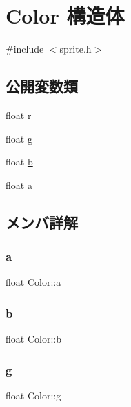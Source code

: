 \hypertarget{struct_color}{}\section{Color 構造体}
\label{struct_color}


{\ttfamily \#include $<$sprite.\+h$>$}

\subsection*{公開変数類}
\begin{DoxyCompactItemize}
\item 
float \mbox{\hyperlink{struct_color_a3958a556b47d2de3dd45c75aac833c20}{r}}
\item 
float \mbox{\hyperlink{struct_color_a5defbb21620e480e556181772d665f34}{g}}
\item 
float \mbox{\hyperlink{struct_color_a33e482be18d6ea31d2b403bee13683b7}{b}}
\item 
float \mbox{\hyperlink{struct_color_a98047aee65fc3d825f88a76da728fd27}{a}}
\end{DoxyCompactItemize}


\subsection{メンバ詳解}
\mbox{\label{struct_color_a98047aee65fc3d825f88a76da728fd27}} 
\subsubsection{\texorpdfstring{a}{a}}
{\footnotesize\ttfamily float Color\+::a}

\mbox{\label{struct_color_a33e482be18d6ea31d2b403bee13683b7}} 
\subsubsection{\texorpdfstring{b}{b}}
{\footnotesize\ttfamily float Color\+::b}

\mbox{\label{struct_color_a5defbb21620e480e556181772d665f34}} 
\subsubsection{\texorpdfstring{g}{g}}
{\footnotesize\ttfamily float Color\+::g}

